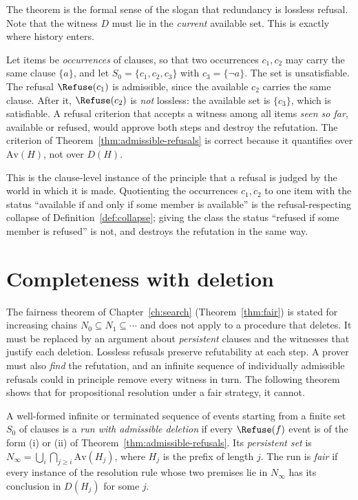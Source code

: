 The theorem is the formal sense of the slogan that redundancy is lossless refusal. Note that the witness $D$ must lie in the \emph{current} available set. This is exactly where history enters.

\begin{example}
\label{ex:dup-cycle}
Let items be \emph{occurrences} of clauses, so that two occurrences $c_1,c_2$ may carry the same clause $\{a\}$, and let $S_0=\{c_1,c_2,c_3\}$ with $c_3=\{\neg a\}$. The set is unsatisfiable. The refusal $\Refuse(c_1)$ is admissible, since the available $c_2$ carries the same clause. After it, $\Refuse(c_2)$ is \emph{not} lossless: the available set is $\{c_3\}$, which is satisfiable. A refusal criterion that accepts a witness among all items \emph{seen so far}, available or refused, would approve both steps and destroy the refutation. The criterion of Theorem~\ref{thm:admissible-refusals} is correct because it quantifies over $\mathrm{Av}(H)$, not over $D(H)$.
\end{example}

This is the clause-level instance of the principle that a refusal is judged by the world in which it is made. Quotienting the occurrences $c_1,c_2$ to one item with the status ``available if and only if some member is available'' is the refusal-respecting collapse of Definition~\ref{def:collapse}; giving the class the status ``refused if some member is refused'' is not, and destroys the refutation in the same way.

\section{Completeness with deletion}

The fairness theorem of Chapter~\ref{ch:search} (Theorem~\ref{thm:fair}) is stated for increasing chains $N_0\subseteq N_1\subseteq\cdots$ and does not apply to a procedure that deletes. It must be replaced by an argument about \emph{persistent} clauses and the witnesses that justify each deletion. Lossless refusals preserve refutability at each step. A prover must also \emph{find} the refutation, and an infinite sequence of individually admissible refusals could in principle remove every witness in turn. The following theorem shows that for propositional resolution under a fair strategy, it cannot.

\begin{definition}
\label{def:fair-deletion}
A well-formed infinite or terminated sequence of events starting from a finite set $S_0$ of clauses is a \emph{run with admissible deletion} if every $\Refuse(f)$ event is of the form (i) or (ii) of Theorem~\ref{thm:admissible-refusals}. Its \emph{persistent set} is $N_\infty=\bigcup_i\bigcap_{j\ge i}\mathrm{Av}(H_j)$, where $H_j$ is the prefix of length $j$. The run is \emph{fair} if every instance of the resolution rule whose two premises lie in $N_\infty$ has its conclusion in $D(H_j)$ for some $j$.
\end{definition}

